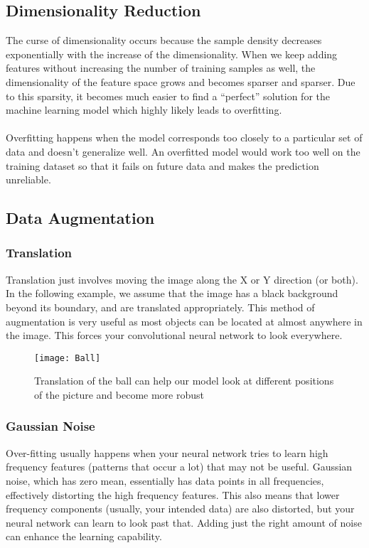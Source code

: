 \documentclass[12pt,onecolumn,a4paper]{article}
\begin{document}
\subsection{Dimensionality Reduction}
The curse of dimensionality occurs because the sample density decreases exponentially with the increase of the dimensionality. When we keep adding features without increasing the number of training samples as well, the dimensionality of the feature space grows and becomes sparser and sparser. Due to this sparsity, it becomes much easier to find a “perfect” solution for the machine learning model which highly likely leads to overfitting.
\\ \\
Overfitting happens when the model corresponds too closely to a particular set of data and doesn’t generalize well. An overfitted model would work too well on the training dataset so that it fails on future data and makes the prediction unreliable.
\subsection{Data Augmentation}
\subsubsection{Translation}
Translation just involves moving the image along the X or Y direction (or both). In the following example, we assume that the image has a black background beyond its boundary, and are translated appropriately. This method of augmentation is very useful as most objects can be located at almost anywhere in the image. This forces your convolutional neural network to look everywhere.
\begin{figure}[H]
	\centering
	\texttt{[image: Ball]}
	\caption{Translation of the ball can help our model look at different positions of the picture and become more robust}
\end{figure}
\subsubsection{Gaussian Noise}
Over-fitting usually happens when your neural network tries to learn high frequency features (patterns that occur a lot) that may not be useful. Gaussian noise, which has zero mean, essentially has data points in all frequencies, effectively distorting the high frequency features. This also means that lower frequency components (usually, your intended data) are also distorted, but your neural network can learn to look past that. Adding just the right amount of noise can enhance the learning capability.
\end{document}
